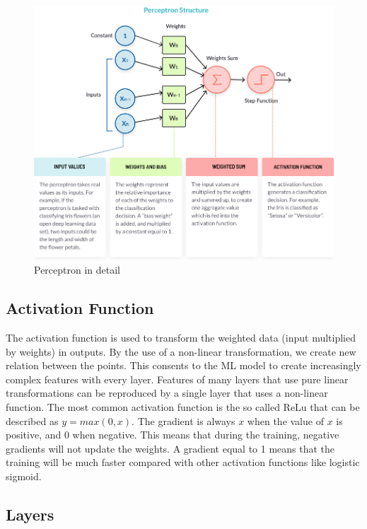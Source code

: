 \documentclass[12pt]{report}
\begin{document}
\begin{figure}[t]
    \centering
    \includegraphics[width=\textwidth]{perceptron-structure.png}
    \caption{Perceptron in detail \cite{percepimage}}
    \label{fig:perceptron}
\end{figure}

\subsection{Activation Function}

The activation function is used to transform the weighted data (input multiplied by weights) 
in outputs.
By the use of a non-linear transformation, we create new relation between the points.
This consents to the ML model to create increasingly complex features with every layer.
Features of many layers that use pure linear transformations can be reproduced by a single 
layer that uses a non-linear function. 
The most common activation function is the so called ReLu that
can be described as $y = max(0, x)$. The gradient is always $x$ when the value of $x$ is positive, 
and 0 when negative. This means that during the training, negative gradients will not update the weights.
A gradient equal to 1 means that the training will be much faster compared with other activation functions
like logistic sigmoid.

\subsection{Layers}
\end{document}
